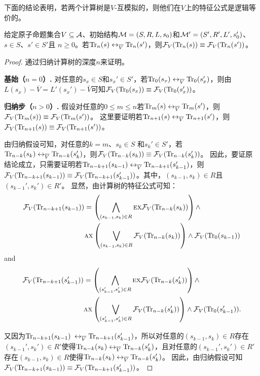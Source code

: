 下面的结论表明，若两个计算树是$V$-互模拟的，则他们在$V$上的特征公式是逻辑等价的。
\begin{lemma}\label{lem:Vb:TrFormula:Equ}
	给定原子命题集合$V\subseteq {\cal A}$、初始结构${\cal M}=(S,R,L,s_0)$和${\cal M}'=(S',R',L',s_0')$、$s\in S$、$s'\in S'$且 $n\ge 0$。若$\textrm{Tr}_n(s) \leftrightarrow_{\overline V} \textrm{Tr}_n(s')$，则${\cal F}_V(\textrm{Tr}_n(s)) \equiv {\cal F}_V(\textrm{Tr}_n(s'))$。
\end{lemma}
\begin{proof}
	通过归纳计算树的深度$n$来证明。
	
	\textbf{基始（$n=0$）.} 对任意的$s_x\in S$和$s_x' \in S'$，若$\textrm{Tr}_0(s_x) \leftrightarrow_{\overline V} \textrm{Tr}_0(s_x')$，则由$L(s_x) - \overline V = L'(s_x') - \overline V$可知${\cal F}_V(\textrm{Tr}_0(s_x)) \equiv {\cal F}_V(\textrm{Tr}_0(s_x'))$。
	
	\textbf{归纳步（$n>0$）.} 假设对任意的$0\leq m \leq n$若$\textrm{Tr}_m(s) \leftrightarrow_{\overline V} \textrm{Tr}_m(s')$，则${\cal F}_V(\textrm{Tr}_m(s)) \equiv {\cal F}_V(\textrm{Tr}_m(s'))$。
	这里要证明若$\textrm{Tr}_{n+1}(s) \leftrightarrow_{\overline V} \textrm{Tr}_{n+1}(s')$，则${\cal F}_V(\textrm{Tr}_{n+1}(s)) \equiv {\cal F}_V(\textrm{Tr}_{n+1}(s'))$。
	
	由归纳假设可知，对任意的$k=m$、$s_k\in S$ 和$s_k'\in S'$，若$\textrm{Tr}_{n-k}(s_k) \leftrightarrow_{\overline V} \textrm{Tr}_{n-k}(s_k')$，则${\cal F}_V(\textrm{Tr}_{n-k}(s_k)) \equiv {\cal F}_V(\textrm{Tr}_{n-k}(s_k'))$。
	因此，要证原结论成立，只需要证明若$\textrm{Tr}_{n-k+1}(s_{k-1}) \leftrightarrow_{\overline V} \textrm{Tr}_{n-k+1}(s_{k-1}')$，则${\cal F}_V(\textrm{Tr}_{n-k+1}(s_{k-1})) \equiv {\cal F}_V(\textrm{Tr}_{n-k+1}(s_{k-1}'))$。其中，$(s_{k-1},s_k)\in R$且$(s_{k-1}',s_k')\in R'$。
	显然，由计算树的特征公式可知：
	\begin{align*}
		{\cal F}_V(\textrm{Tr}_{n-k+1}(s_{k-1})) &  =
		\left(\bigwedge_{(s_{k-1},s_k)\in R}
		\textsc{e} \textsc{x} {\cal F}_V(\textrm{Tr}_{n-k}(s_k))\right)
		\wedge \\
		&\textsc{a} \textsc{x}\left(\bigvee_{(s_{k-1},s_k)\in R}
		{\cal F}_V(\textrm{Tr}_{n-k}(s_k) )\right)
		\wedge {\cal F}_V(\textrm{Tr}_0(s_{k-1}))
	\end{align*}
	and
	\begin{align*}
		{\cal F}_V(\textrm{Tr}_{n-k+1}(s_{k-1}')) &  =
		\left(\bigwedge_{(s_{k-1}',s_k')\in R}
		\textsc{e} \textsc{x} {\cal F}_V(\textrm{Tr}_{n-k}(s_k'))\right)
		\wedge \\
		&\textsc{a} \textsc{x}\left(\bigvee_{(s_{k-1}',s_k')\in R}
		{\cal F}_V(\textrm{Tr}_{n-k}(s_k') )\right)
		\wedge {\cal F}_V(\textrm{Tr}_0(s_{k-1}')).
	\end{align*} 

	又因为$\textrm{Tr}_{n-k+1}(s_{k-1})$ $\leftrightarrow_{\overline V} \textrm{Tr}_{n-k+1}(s_{k-1}')$，所以对任意的$(s_{k-1}, s_k) \in R$存在$(s_{k-1}', s_k') \in R'$使得$\textrm{Tr}_{n-k}(s_k) \leftrightarrow_{\overline V} \textrm{Tr}_{n-k}(s_k')$，且对任意的$(s_{k-1}', s_k') \in R'$存在$(s_{k-1}, s_k) \in R$使得$\textrm{Tr}_{n-k}(s_k) \leftrightarrow_{\overline V} \textrm{Tr}_{n-k}(s_k')$。
	因此，由归纳假设可知${\cal F}_V(\textrm{Tr}_{n-k+1}(s_{k-1})) \equiv {\cal F}_V(\textrm{Tr}_{n-k+1}(s_{k-1}'))$。
\end{proof}

